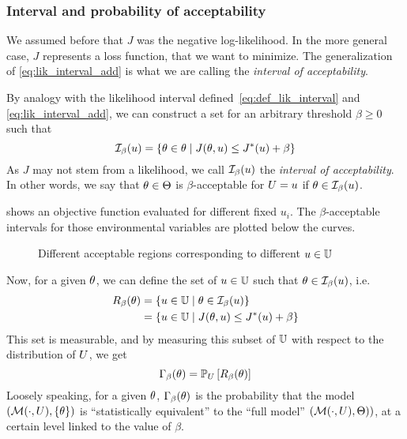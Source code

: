 \documentclass[../../Main_ManuscritThese.tex]{subfiles}
\newcommand\imgpath{/home/victor/acadwriting/Manuscrit/Text/Chapter3/img/}
\begin{document}
  
  \subsubsection{Interval and probability of acceptability}
     \label{ssec:general_cost_prob}
 We assumed before that $J$ was the negative log-likelihood. In the more general case, $J$ represents a loss function, that we want to minimize. The generalization of \cref{eq:lik_interval_add} is what we are calling the \emph{interval of acceptability}.
  \begin{definition}
  By analogy with the likelihood interval defined~\cref{eq:def_lik_interval} and \cref{eq:lik_interval_add}, we can construct a set for an arbitrary threshold $\beta \geq 0$ such that
  \begin{equation}
    \mathcal{I}_{\beta}(u) = \left\{\theta \in \theta \mid J(\theta,u) \leq J^*(u) + \beta \right\}
  \end{equation}
As $J$ may not stem from a likelihood, we call $\mathcal{I}_{\beta}(u)$ the \emph{interval of acceptability}. In other words, we say that $\theta\in \Theta$ is $\beta$-acceptable for $U=u$ if $\theta \in \mathcal{I}_{\beta}(u)$. 
\end{definition}

 shows an objective function evaluated for different fixed $u_i$. The $\beta$-acceptable intervals for those environmental variables are plotted below the curves.
\begin{figure}[ht]
  \centering
  
  \caption{\label{fig:lik_interval_threshold} Different acceptable regions corresponding to different $u \in \mathbb{U}$}
\end{figure}

  Now, for a given $\theta$, we can define the set of $u\in \mathbb{U}$ such that $\theta \in  \mathcal{I}_{\beta}(u)$, i.e.\
  \begin{align}
    R_{\beta}(\theta) &= \left\{u\in \mathbb{U} \mid \theta \in \mathcal{I}_{\beta}(u) \right\} \\
           &= \left\{u\in \mathbb{U} \mid J(\theta, u)  \leq J^*(u) + \beta \right\}
  \end{align}
 This set is measurable, and by measuring this subset of $\mathbb{U}$ with respect to the distribution of $U$, we get
  \begin{equation}
    \label{eq:def_gamma_additive}
    \Gamma_\beta(\theta) = \mathbb{P}_U\left[R_{\beta}(\theta)\right]
  \end{equation}
  Loosely speaking, for a given $\theta$, $\Gamma_{\beta}(\theta)$ is the probability that the model $(\mathcal{M}(\cdot, U), \{\theta\})$ is ``statistically equivalent'' to the ``full model'' $\left(\mathcal{M}(\cdot, U), \Theta)\right)$, at a certain level linked to the value of $\beta$.
\end{document}
